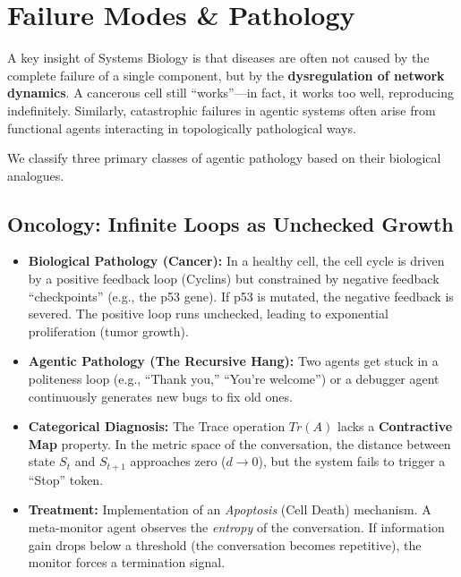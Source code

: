 \documentclass[11pt, a4paper]{article}
\begin{document}
\section{Failure Modes \& Pathology}

A key insight of Systems Biology is that diseases are often not caused by the complete failure of a single component, but by the \textbf{dysregulation of network dynamics}. A cancerous cell still ``works''---in fact, it works too well, reproducing indefinitely. Similarly, catastrophic failures in agentic systems often arise from functional agents interacting in topologically pathological ways.

We classify three primary classes of agentic pathology based on their biological analogues.

\subsection{Oncology: Infinite Loops as Unchecked Growth}
\begin{itemize}
    \item \textbf{Biological Pathology (Cancer):} In a healthy cell, the cell cycle is driven by a positive feedback loop (Cyclins) but constrained by negative feedback ``checkpoints'' (e.g., the p53 gene). If p53 is mutated, the negative feedback is severed. The positive loop runs unchecked, leading to exponential proliferation (tumor growth).
    \item \textbf{Agentic Pathology (The Recursive Hang):} Two agents get stuck in a politeness loop (e.g., ``Thank you,'' ``You're welcome'') or a debugger agent continuously generates new bugs to fix old ones.
    \item \textbf{Categorical Diagnosis:} The Trace operation $Tr(A)$ lacks a \textbf{Contractive Map} property. In the metric space of the conversation, the distance between state $S_t$ and $S_{t+1}$ approaches zero ($d \to 0$), but the system fails to trigger a ``Stop'' token.
    \item \textbf{Treatment:} Implementation of an \textit{Apoptosis} (Cell Death) mechanism. A meta-monitor agent observes the \textit{entropy} of the conversation. If information gain drops below a threshold (the conversation becomes repetitive), the monitor forces a termination signal.
\end{itemize}
\end{document}

